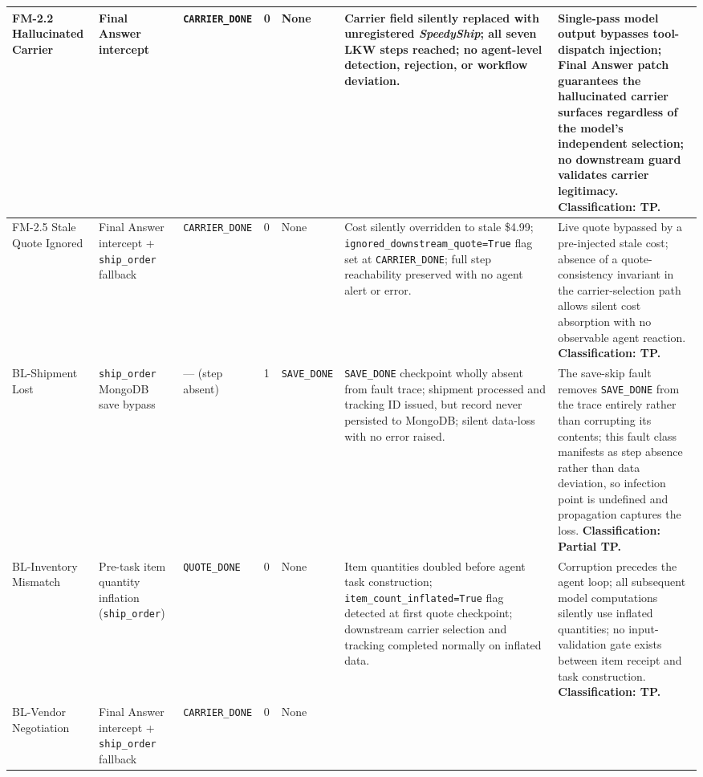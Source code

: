 \documentclass[conference]{IEEEtran}
\begin{document}
\begin{table}[!t]
{\begin{tabular}{p{1.6cm}p{1.8cm}p{2.6cm}p{2.0cm}p{1.5cm}p{3.7cm}p{3.7cm}}
\midrule
FM-2.2 Hallucinated Carrier
  & Final Answer intercept
  & \texttt{CARRIER\_DONE}
  & 0
  & None
  & Carrier field silently replaced with unregistered \emph{SpeedyShip}; all
    seven LKW steps reached; no agent-level detection, rejection, or workflow
    deviation.
  & Single-pass model output bypasses tool-dispatch injection; Final Answer
    patch guarantees the hallucinated carrier surfaces regardless of the model's
    independent selection; no downstream guard validates carrier legitimacy.
    \textbf{Classification: TP.} \\
\midrule
FM-2.5 Stale Quote Ignored
  & Final Answer intercept + \texttt{ship\_order} fallback
  & \texttt{CARRIER\_DONE}
  & 0
  & None
  & Cost silently overridden to stale \$4.99; \texttt{ignored\_downstream\_quote=True}
    flag set at \texttt{CARRIER\_DONE}; full step reachability preserved with no
    agent alert or error.
  & Live quote bypassed by a pre-injected stale cost; absence of a
    quote-consistency invariant in the carrier-selection path allows silent cost
    absorption with no observable agent reaction. \textbf{Classification: TP.} \\
\midrule
BL-Shipment Lost
  & \texttt{ship\_order} MongoDB save bypass
  & --- (step absent)
  & 1
  & \texttt{SAVE\_DONE}
  & \texttt{SAVE\_DONE} checkpoint wholly absent from fault trace; shipment
    processed and tracking ID issued, but record never persisted to MongoDB;
    silent data-loss with no error raised.
  & The save-skip fault removes \texttt{SAVE\_DONE} from the trace entirely
    rather than corrupting its contents; this fault class manifests as step
    absence rather than data deviation, so infection point is undefined and
    propagation captures the loss. \textbf{Classification: Partial TP.} \\
\midrule
BL-Inventory Mismatch
  & Pre-task item quantity inflation (\texttt{ship\_order})
  & \texttt{QUOTE\_DONE}
  & 0
  & None
  & Item quantities doubled before agent task construction;
    \texttt{item\_count\_inflated=True} flag detected at first quote checkpoint;
    downstream carrier selection and tracking completed normally on inflated data.
  & Corruption precedes the agent loop; all subsequent model computations
    silently use inflated quantities; no input-validation gate exists between
    item receipt and task construction. \textbf{Classification: TP.} \\
\midrule
BL-Vendor Negotiation
  & Final Answer intercept + \texttt{ship\_order} fallback
  & \texttt{CARRIER\_DONE}
  & 0
  & None

\end{tabular}}
\end{table}
\end{document}
